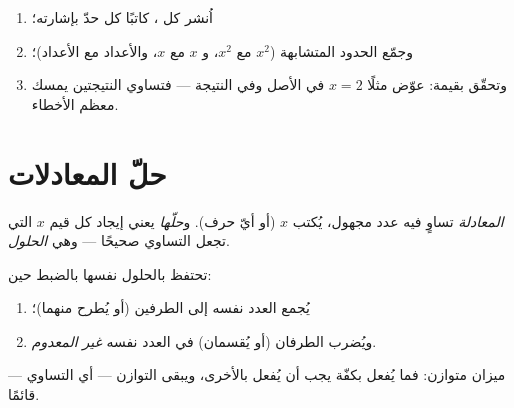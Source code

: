 \begin{method}\label{met:g8:equations:reduce}
\begin{enumerate}
  \item اُنشر كل ، كاتبًا كل حدّ بإشارته؛
  \item وجمّع الحدود المتشابهة ($x^2$ مع $x^2$، و $x$ مع $x$، والأعداد
        مع الأعداد)؛
  \item وتحقّق بقيمة: عوّض مثلًا $x = 2$ في الأصل
        وفي النتيجة --- فتساوي النتيجتين يمسك معظم الأخطاء.
\end{enumerate}
\end{method}

\section{حلّ المعادلات}

\begin{definition}[المعادلة]\label{def:g8:equations:def}
\emph{المعادلة} تساوٍ فيه عدد
مجهول، يُكتب $x$ (أو أيّ حرف). و\emph{حلّها} يعني إيجاد
كل قيم $x$ التي تجعل التساوي صحيحًا --- وهي
\emph{الحلول}.
\end{definition}

\begin{theorem}\label{thm:g8:equations:balance}
تحتفظ  بالحلول نفسها بالضبط حين:
\begin{enumerate}
  \item يُجمع العدد نفسه إلى الطرفين (أو يُطرح منهما)؛
  \item ويُضرب الطرفان (أو يُقسمان) في العدد نفسه
        \emph{غير المعدوم}.
\end{enumerate}
\end{theorem}
\admitted

\begin{omfigure}

{\small {} ميزان متوازن: فما يُفعل بكفّة
يجب أن يُفعل بالأخرى، ويبقى التوازن --- أي التساوي ---
قائمًا.}
\end{omfigure}

